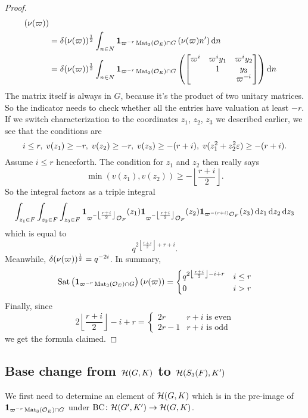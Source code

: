 \begin{proof}
\begin{align*}
      \left( \nu(\varpi)  \right) \\
    &= \delta(\nu(\varpi))^\half \int_{n \in N}
      \mathbf{1}_{\varpi^{-r} \Mat_3(\OO_E) \cap G}
      \left( \nu(\varpi) n' \right) \odif n \\
    &= \delta(\nu(\varpi))^\half \int_{n \in N}
      \mathbf{1}_{{\varpi^{-r}} \Mat_3(\OO_E) \cap G}
      \left( \begin{bmatrix} \varpi^i & \varpi^i y_1 & \varpi^i y_2 \\
               & 1 & y_3 \\
               & & \varpi^{-i} \end{bmatrix} \right) \odif n
  \end{align*}
  The matrix itself is always in $G$, because it's the product of two unitary matrices.
  So the indicator needs to check whether all the entries have valuation at least $-r$.
  If we switch characterization to the coordinates $z_1$, $z_2$, $z_3$ we described earlier,
  we see that the conditions are
  \[ i \le r, \; v(z_1) \ge -r, \; v(z_2) \ge -r, \; v(z_3) \ge -(r+i), \;
    v(z_1^2 + z_2^2 \varepsilon) \ge -(r+i). \]
  Assume $i \le r$ henceforth.
  The condition for $z_1$ and $z_2$ then really says
  \[ \min(v(z_1), v(z_2)) \ge -\left\lfloor \frac{r+i}{2} \right\rfloor. \]
  So the integral factors as a triple integral
  \[
    \int_{z_1 \in F}
    \int_{z_2 \in F}
    \int_{z_3 \in F}
    \mathbf{1}_{\varpi^{-\left\lfloor \frac{r+i}{2} \right\rfloor} \OO_F}(z_1)
    \mathbf{1}_{\varpi^{-\left\lfloor \frac{r+i}{2} \right\rfloor} \OO_F}(z_2)
    \mathbf{1}_{\varpi^{-(r+i)} \OO_F}(z_3)
    \odif{z_1,z_2,z_3}
  \]
  which is equal to
  \[ q^{2\left\lfloor \frac{r+i}{2} \right\rfloor+r+i}. \]
  Meanwhile, $\delta(\nu(\varpi))^{\frac{1}{2}} = q^{-2i}$.
  In summary,
  \[
    \operatorname{Sat}\left( \mathbf{1}_{\varpi^{-r} \operatorname{Mat}_3(\mathcal O_E) \cap G}\right) \left( \nu(\varpi) \right)
    =
    \begin{cases}
      q^{2\left\lfloor \frac{r+i}{2} \right\rfloor - i + r} & i \le r \\
      0 & i > r
    \end{cases}
  \]
  Finally, since
  \[ 2\left\lfloor \frac{r+i}{2} \right\rfloor - i + r
    = \begin{cases}
      2r & r+i \text{ is even} \\
      2r-1 & r+i \text{ is odd}
    \end{cases}
  \]
  we get the formula claimed.
\end{proof}

\subsection{Base change from $\mathcal H(G,K)$ to $\mathcal H(S_3(F), K')$}
We first need to determine an element of $\mathcal H(G,K)$
which is in the pre-image of $\mathbf{1}_{\varpi^{-r} \operatorname{Mat}_3(\mathcal O_E) \cap G}$
under $\operatorname{BC} \colon \mathcal H(G', K') \to \mathcal H(G, K)$.

